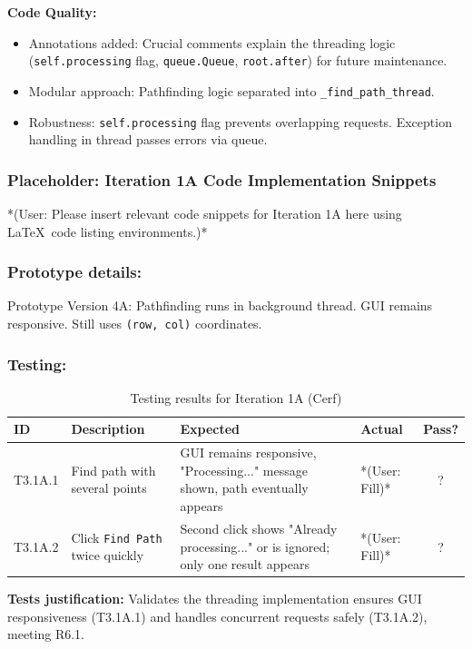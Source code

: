 \textbf{Code Quality:}
\begin{itemize}
	\item Annotations added: Crucial comments explain the threading logic (\verb|self.processing| flag, \verb|queue.Queue|, \verb|root.after|) for future maintenance.
	\item Modular approach: Pathfinding logic separated into \verb|_find_path_thread|.
	\item Robustness: \verb|self.processing| flag prevents overlapping requests. Exception handling in thread passes errors via queue.
\end{itemize}

\newpage
\subsubsection*{Placeholder: Iteration 1A Code Implementation Snippets}
*(User: Please insert relevant code snippets for Iteration 1A here using \LaTeX\ code listing environments.)*
\newpage

\subsubsection{Prototype details:}
Prototype Version 4A: Pathfinding runs in background thread. GUI remains responsive. Still uses \verb|(row, col)| coordinates.

\subsubsection{Testing:}
\begin{table}[htbp]
	\centering
	\begin{tabularx}{\textwidth}{|l|X|p{4.5cm}|p{1.5cm}|c|}
		\hline
		\textbf{ID} & \textbf{Description} & \textbf{Expected} & \textbf{Actual} & \textbf{Pass?} \\
		\hline
		T3.1A.1 & Find path with several points & GUI remains responsive, "Processing..." message shown, path eventually appears & *(User: Fill)* & ? \\
		\hline
		T3.1A.2 & Click \verb|Find Path| twice quickly & Second click shows "Already processing..." or is ignored; only one result appears & *(User: Fill)* & ? \\
		\hline
	\end{tabularx}
	\caption{Testing results for Iteration 1A (Cerf)}
\end{table}
\textbf{Tests justification:} Validates the threading implementation ensures GUI responsiveness (T3.1A.1) and handles concurrent requests safely (T3.1A.2), meeting R6.1.

